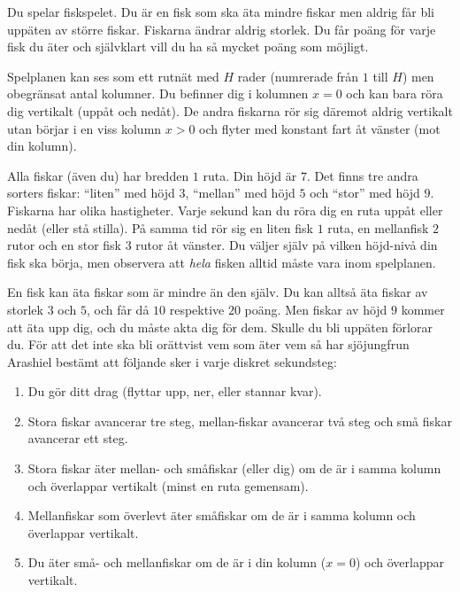 Du spelar fiskspelet. Du är en fisk som ska äta mindre fiskar men aldrig får
bli uppäten av större fiskar. Fiskarna ändrar aldrig storlek. Du får poäng för varje fisk du äter och självklart vill du ha så mycket
poäng som möjligt.

Spelplanen kan ses som ett rutnät med $H$ rader (numrerade från $1$ till $H$) men obegränsat antal kolumner. Du befinner dig i kolumnen $x=0$ och kan bara röra dig vertikalt (uppåt och nedåt). De andra fiskarna rör sig däremot aldrig vertikalt utan börjar i en viss kolumn $x>0$ och flyter med konstant fart åt vänster (mot din kolumn). 

Alla fiskar (även du) har bredden $1$ ruta. Din höjd är $7$. Det finns tre andra sorters fiskar: ``liten'' med höjd $3$, ``mellan'' med höjd $5$ och ``stor'' med höjd $9$. Fiskarna har olika hastigheter. Varje sekund kan du röra dig en ruta uppåt eller nedåt (eller stå stilla). På samma tid rör sig en liten fisk $1$ ruta, en mellanfisk $2$ rutor och en stor fisk $3$ rutor åt vänster. Du väljer själv på vilken höjd-nivå din fisk ska börja, men observera att \emph{hela} fisken alltid måste vara inom spelplanen. 


En fisk kan äta fiskar som är mindre än den själv. Du kan alltså äta fiskar av storlek $3$ och $5$, och får då $10$ respektive $20$ poäng. Men fiskar av höjd $9$ kommer att äta upp dig, och du måste akta dig för dem. Skulle du bli uppäten förlorar du. För att det inte ska bli orättvist vem som
äter vem så har sjöjungfrun Arashiel bestämt att följande sker i varje diskret
sekundsteg:
\begin{enumerate}
  \item
     Du gör ditt drag (flyttar upp, ner, eller stannar kvar).
  \item
     Stora fiskar avancerar tre steg, mellan-fiskar avancerar två steg och små fiskar avancerar ett steg.
  \item
     Stora fiskar äter mellan- och småfiskar (eller dig) om de är i samma kolumn och överlappar vertikalt (minst en ruta gemensam).
  \item
     Mellanfiskar som överlevt äter småfiskar om de är i samma kolumn och överlappar vertikalt.
  \item
     Du äter små- och mellanfiskar om de är i din kolumn ($x=0$) och överlappar vertikalt.
\end{enumerate}


